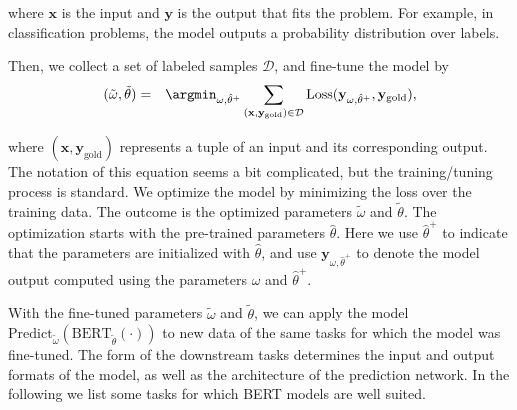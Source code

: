 \noindent where $\mathbf{x}$ is the input and $\mathbf{y}$ is the output that fits the problem. For example, in classification problems, the model outputs a probability distribution over labels.

Then, we collect a set of labeled samples $\mathcal{D}$, and fine-tune the model by
\begin{eqnarray}
(\tilde{\omega},\tilde{\theta}) & = & \argmin_{\omega,\hat{\theta}^{+}} \sum_{(\mathbf{x},\mathbf{y}_{\mathrm{gold}}) \in \mathcal{D}} \mathrm{Loss}(\mathbf{y}_{\omega,\hat{\theta}^{+}},\mathbf{y}_{\mathrm{gold}}),
\end{eqnarray}

\noindent where $(\mathbf{x},\mathbf{y}_{\mathrm{gold}})$ represents a tuple of an input and its corresponding output. The notation of this equation seems a bit complicated, but the training/tuning process is standard. We optimize the model by minimizing the loss over the training data. The outcome is the optimized parameters $\tilde{\omega}$ and $\tilde{\theta}$. The optimization starts with the pre-trained parameters $\hat{\theta}$. Here we use $\hat{\theta}^{+}$ to indicate that the parameters are initialized with $\hat{\theta}$, and use $\mathbf{y}_{\omega,\hat{\theta}^{+}}$ to denote the model output computed using the parameters $\omega$ and $\hat{\theta}^{+}$.

With the fine-tuned parameters $\tilde{\omega}$ and $\tilde{\theta}$, we can apply the model $\mathrm{Predict}_{\tilde{\omega}}(\mathrm{BERT}_{\tilde{\theta}}(\cdot))$ to new data of the same tasks for which the model was fine-tuned. The form of the downstream tasks determines the input and output formats of the model, as well as the architecture of the prediction network. In the following we list some tasks for which BERT models are well suited.

